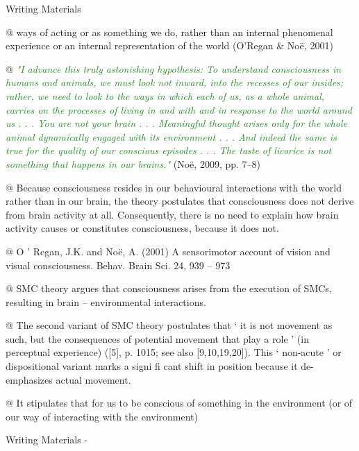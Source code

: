 \documentclass[utf8]{article}
\newenvironment{WritingMaterials} %
    	{
            \begin{tcolorbox}[enhanced,
                title=-,
                size=small,
                colbacktitle=Aquamarine,
                drop fuzzy shadow,
                fontupper=\small,
                boxrule=0.4pt,
                colback=Aquamarine!10!white,
                sharp corners]
                Writing Materials
            \end{tcolorbox}
            \begin{easylist}[itemize]
    	}
    	{
            \end{easylist}  
            \begin{tcolorbox}[enhanced,
                halign=flush right,
                halign title=right,
                size=small,
                colbacktitle=Aquamarine,
                drop fuzzy shadow,
                fontupper=\small,
                boxrule=0.4pt,
                colback=Aquamarine,
                colupper=White,
                sharp corners]
                Writing Materials -
            \end{tcolorbox}        
    	}
\newcommand{\rewrite}[1]{\textcolor{ForestGreen}{\textit{"#1"}}\newline}
\begin{document}
\begin{WritingMaterials}
				@ ways of acting or as something we do, rather than an internal phenomenal experience or an internal representation of the world (O’Regan \& Noë, 2001)

				@ \rewrite{I advance this truly astonishing hypothesis: To understand consciousness in humans and animals, we must look not inward, into the recesses of our insides; rather, we need to look to the ways in which each of us, as a whole animal, carries on the processes of living in and with and in response to the world around us . . . You are not your brain . . . Meaningful thought arises only for the whole animal dynamically engaged with its environment . . . And indeed the same is true for the quality of our conscious episodes . . . The taste of licorice is not something that happens in our brains.} (Noë, 2009, pp. 7–8)

				@ Because consciousness resides in our behavioural interactions with the world rather than in our brain, the theory postulates that consciousness does not derive from brain activity at all. Consequently, there is no need to explain how brain activity causes or constitutes consciousness, because it does not.

				@ O ’ Regan, J.K. and Noë, A. (2001) A sensorimotor account of vision and visual consciousness. Behav. Brain Sci. 24, 939 – 973

				@ SMC theory argues that consciousness arises from the execution of SMCs, resulting in brain – environmental interactions.

				@ The second variant of SMC theory postulates that ‘ it is not movement as such, but the consequences of potential movement that play a role ’ (in perceptual experience) ([5], p. 1015; see also [9,10,19,20]). This ‘ non-acute ’ or dispositional variant marks a signi ﬁ cant shift in position because it de-emphasizes actual movement. \cite{pennartz2017consciousness}

				@ It stipulates that for us to be conscious of something in the environment (or of our way of interacting with the environment)

			\end{WritingMaterials}
\end{document}
